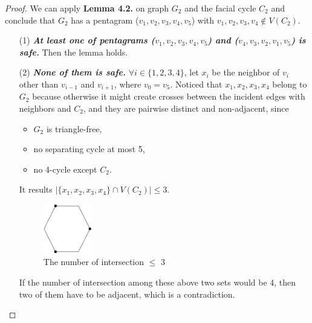 \begin{proof}
We can apply \textbf{Lemma 4.2.} on graph $G_2$ and the facial cycle $C_2$ and conclude that $G_2$ has a pentagram ($v_1, v_2, v_3, v_4, v_5$) with $v_1, v_2, v_3, v_4 \notin V(C_2)$.
\begin{itemize}
    \item[(1)] \textit{\textbf{At least one of pentagrams ($v_1, v_2, v_3, v_4, v_5$) and ($v_4, v_3, v_2, v_1, v_5$) is safe.}} Then the lemma holds.
    \item[(2)] \textit{\textbf{None of them is safe.}} $\forall i \in \{1, 2, 3, 4\}$, let $x_i$ be the neighbor of $v_i$ other than $v_{i-1}$ and $v_{i+1}$, where $v_0 = v_5$. Noticed that $x_1, x_2, x_3, x_4$ belong to $G_2$ because otherwise it might create crosses between the incident edges with neighbors and $C_2$, and they are pairwise distinct and non-adjacent, since 
    \begin{itemize}
        \item $G_2$ is triangle-free,
        \item no separating cycle at most 5,
        \item no 4-cycle except $C_2$.
    \end{itemize}
    It results $|\{x_1, x_2, x_3, x_4\} \cap V(C_2)| \leq 3$.
    \begin{figure}[H] %
    \centering %
    \includegraphics[width=0.2\textwidth]{figure/intersect3vertices.png} 
    \caption{The number of intersection $\leq$ 3} %
    \label{figure} %
    \end{figure}
    If the number of intersection among these above two sets would be 4, then two of them have to be adjacent, which is a contradiction.


\end{itemize}
\end{proof}
